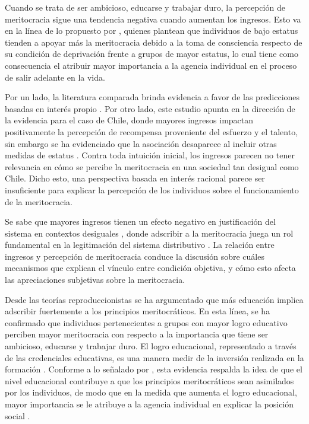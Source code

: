 \documentclass[12pt]{article}
\begin{document}
Cuando se trata de ser ambicioso, educarse y trabajar duro, la percepción de meritocracia sigue una tendencia negativa cuando aumentan los ingresos. Esto va en la línea de lo propuesto por \cite{Solt2016}, quienes plantean que individuos de bajo estatus tienden a apoyar más la meritocracia debido a la toma de consciencia respecto de su condición de deprivación frente a grupos de mayor estatus, lo cual tiene como consecuencia el atribuir mayor importancia a la agencia individual en el proceso de salir adelante en la vida.

Por un lado, la literatura comparada brinda evidencia a favor de las predicciones basadas en interés propio \citep{Kunovich2007,Duru-bellat2012}. Por otro lado, este estudio apunta en la dirección de la evidencia para el caso de Chile, donde mayores ingresos impactan positivamente la percepción de recompensa proveniente del esfuerzo y el talento, sin embargo se ha evidenciado que la asociación desaparece al incluir otras medidas de estatus \citep{Castillo2018}. Contra toda intuición inicial, los ingresos parecen no tener relevancia en cómo se percibe la meritocracia en una sociedad tan desigual como Chile. Dicho esto, una perspectiva basada en interés racional parece ser insuficiente para explicar la percepción de los individuos sobre el funcionamiento de la meritocracia.

Se sabe que mayores ingresos tienen un efecto negativo en justificación del sistema en contextos desiguales \citep{Vargas-Salfate2018}, donde adscribir a la meritocracia juega un rol fundamental en la legitimación del sistema distributivo \citep{Day2017}. La relación entre ingresos y percepción de meritocracia conduce la discusión sobre cuáles mecanismos que explican el vínculo entre condición objetiva, y cómo esto afecta las apreciaciones subjetivas sobre la meritocracia.      


Desde las teorías reproduccionistas se ha argumentado que más educación implica adscribir fuertemente a los principios meritocráticos. En esta línea, se ha confirmado que individuos pertenecientes a grupos con mayor logro educativo perciben mayor meritocracia con respecto a la importancia que tiene ser ambicioso, educarse y trabajar duro. El logro educacional, representado a través de las credenciales educativas, es una manera medir de la inversión realizada en la formación \citep{Lampert2013}. Conforme a lo señalado por \cite{Bourdieu1981}, esta evidencia respalda la idea de que el nivel educacional contribuye a que los principios meritocráticos sean asimilados por los individuos, de modo que en la medida que aumenta el logro educacional, mayor importancia se le atribuye a la agencia individual en explicar la posición social \citep{Landerretche2011}.  
\end{document}
